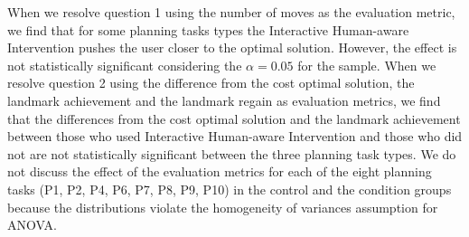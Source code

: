 When we resolve question 1 using the number of moves as the evaluation metric, we find that for some planning tasks types the Interactive Human-aware Intervention pushes the user closer to the optimal solution. However, the effect is not statistically significant considering the $\alpha=0.05$ for the sample.
When we resolve question 2 using the difference from the cost optimal solution, the landmark achievement and the landmark regain as evaluation metrics, we find that the differences from the cost optimal solution and the landmark achievement between those who used Interactive Human-aware Intervention and those who did not are not statistically significant between the three planning task types.
We do not discuss the effect of the evaluation metrics for each of the eight planning tasks (P1, P2, P4, P6, P7, P8, P9, P10) in the control and the condition groups because the distributions violate the homogeneity of variances assumption for ANOVA.

